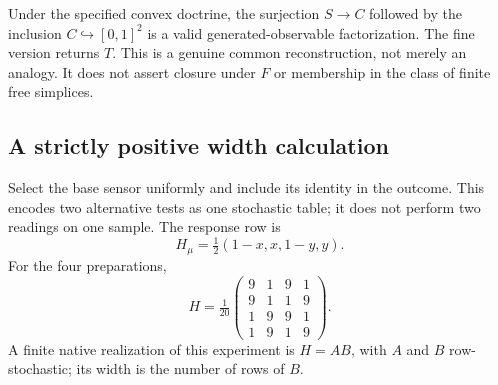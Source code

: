 \documentclass[11pt]{article}
\theoremstyle{definition}
\begin{document}
Under the specified convex doctrine, the surjection $S\to C$ followed by the inclusion $C\hookrightarrow[0,1]^2$ is a valid generated-observable factorization. The fine version returns $T$. This is a genuine common reconstruction, not merely an analogy. It does not assert closure under $F$ or membership in the class of finite free simplices.

\subsection{A strictly positive width calculation}
Select the base sensor uniformly and include its identity in the outcome. This encodes two alternative tests as one stochastic table; it does not perform two readings on one sample. The response row is
\[
 H_\mu=\tfrac12(1-x,x,1-y,y).
\]
For the four preparations,
\begin{equation}\label{eq:H}
 H=\tfrac1{20}
 \begin{pmatrix}9&1&9&1\\9&1&1&9\\1&9&9&1\\1&9&1&9\end{pmatrix}.
\end{equation}
A finite native realization of this experiment is $H=AB$, with $A$ and $B$ row-stochastic; its width is the number of rows of $B$.
\end{document}
